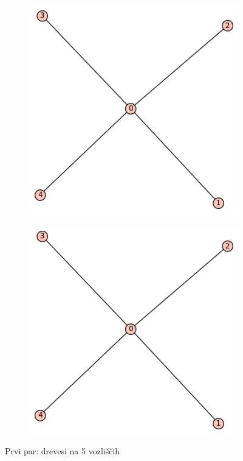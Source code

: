 \documentclass[12pt, a4paper]{article}
\begin{document}
\begin{center}
\begin{figure}[!htb]
\centering
\begin{subfigure}{0.5\textwidth}
  \centering
  \includegraphics[width=0.4\linewidth]{t-7}
\end{subfigure}%
\begin{subfigure}{0.5\textwidth}
  \centering
  \includegraphics[width=0.4\linewidth]{t-7}
\end{subfigure}
\caption{Prvi par: drevesi na 5 vozliščih}
\label{fig:test}
\end{figure}
\end{center}

\pagebreak
\end{document}
